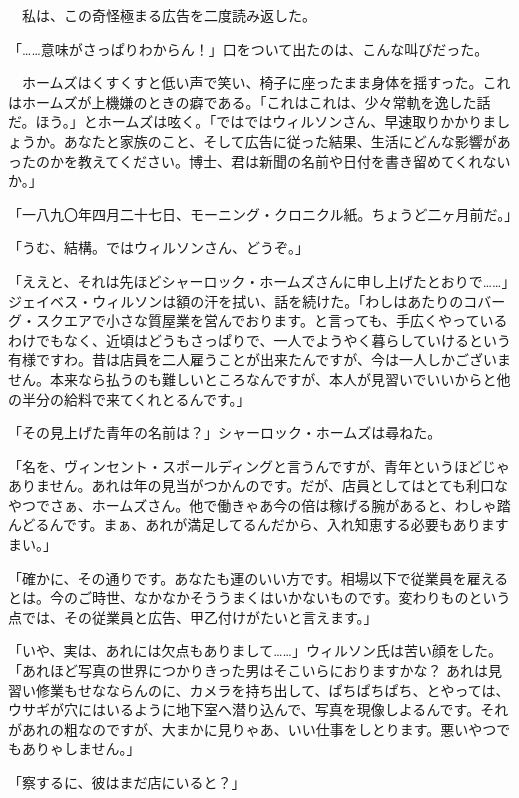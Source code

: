 \documentclass[tate,paper=b6j,jafontsize=9pt]{jlreq}
\begin{document}
　私は、この奇怪極まる広告を二度読み返した。

「……意味がさっぱりわからん！」口をついて出たのは、こんな叫びだった。


　ホームズはくすくすと低い声で笑い、椅子に座ったまま身体を揺すった。これはホームズが上機嫌のときの癖である。「これはこれは、少々常軌を逸した話だ。ほう。」とホームズは呟く。「ではではウィルソンさん、早速取りかかりましょうか。あなたと家族のこと、そして広告に従った結果、生活にどんな影響があったのかを教えてください。博士、君は新聞の名前や日付を書き留めてくれないか。」

「一八九〇年四月二十七日、モーニング・クロニクル紙。ちょうど二ヶ月前だ。」

「うむ、結構。ではウィルソンさん、どうぞ。」

「ええと、それは先ほどシャーロック・ホームズさんに申し上げたとおりで……」ジェイベス・ウィルソンは額の汗を拭い、話を続けた。「わしはあたりのコバーグ・スクエアで小さな質屋業を営んでおります。と言っても、手広くやっているわけでもなく、近頃はどうもさっぱりで、一人でようやく暮らしていけるという有様ですわ。昔は店員を二人雇うことが出来たんですが、今は一人しかございません。本来なら払うのも難しいところなんですが、本人が見習いでいいからと他の半分の給料で来てくれとるんです。」

「その見上げた青年の名前は？」シャーロック・ホームズは尋ねた。

「名を、ヴィンセント・スポールディングと言うんですが、青年というほどじゃありません。あれは年の見当がつかんのです。だが、店員としてはとても利口なやつでさぁ、ホームズさん。他で働きゃあ今の倍は稼げる腕があると、わしゃ踏んどるんです。まぁ、あれが満足してるんだから、入れ知恵する必要もありますまい。」

「確かに、その通りです。あなたも運のいい方です。相場以下で従業員を雇えるとは。今のご時世、なかなかそううまくはいかないものです。変わりものという点では、その従業員と広告、甲乙付けがたいと言えます。」

「いや、実は、あれには欠点もありまして……」ウィルソン氏は苦い顔をした。「あれほど写真の世界につかりきった男はそこいらにおりますかな？ あれは見習い修業もせなならんのに、カメラを持ち出して、ぱちぱちぱち、とやっては、ウサギが穴にはいるように地下室へ潜り込んで、写真を現像しよるんです。それがあれの粗なのですが、大まかに見りゃあ、いい仕事をしとります。悪いやつでもありゃしません。」

「察するに、彼はまだ店にいると？」
\end{document}

